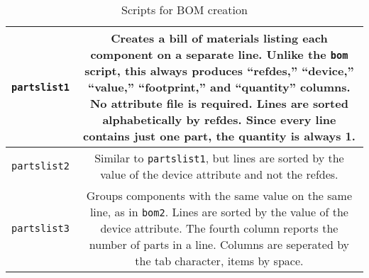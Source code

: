 \begin{table}[ht]
\begin{center}
\begin{tabular}{|c|c|}
			\begin{minipage}[c][\height+\heightpad][c]{\namewidth}
 				\begin{center}
    					\texttt{partslist1}
    				\end{center}
			\end{minipage}
			&\begin{minipage}[c][\height+\heightpad][c]{\descwidth}
				Creates a bill of materials listing each component on a separate line.  Unlike the \texttt{bom} script, this always produces ``refdes,'' ``device,'' ``value,'' ``footprint,'' and ``quantity'' columns.  No attribute file is required.  Lines are sorted alphabetically by refdes.  Since every line contains just one part, the quantity is always 1.
			\end{minipage}\\
			\hline	
			
			\begin{minipage}[c][\height+\heightpad][c]{\namewidth}
 				\begin{center}
    					\texttt{partslist2}
    				\end{center}
			\end{minipage}
			&\begin{minipage}[c][\height+\heightpad][c]{\descwidth}
				Similar to \texttt{partslist1}, but lines are sorted by the value of the device attribute and not the refdes.
			\end{minipage}\\
			\hline						
			
			\begin{minipage}[c][\height+\heightpad][c]{\namewidth}
 				\begin{center}
    					\texttt{partslist3}
    				\end{center}
			\end{minipage}
			&\begin{minipage}[c][\height+\heightpad][c]{\descwidth}
				Groups components with the same value on the same line, as in \texttt{bom2}.  Lines are sorted by the value of the device attribute. The fourth column reports the number of parts in a line. Columns are seperated by the tab character, items by space.
			\end{minipage}\\
			\hline				

		\end{tabular}
		\caption{Scripts for BOM creation\label{bom_scripts}}
	\end{center}
\end{table}
